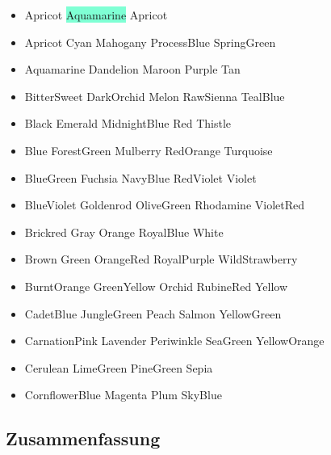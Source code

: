 \begin{itemize}
	\item[] \colorbox{Apricot}{Apricot} \colorbox{Aquamarine}{Aquamarine}
            \textcolor{Apricot}{Apricot}
	\item[] Apricot		Cyan		Mahogany		ProcessBlue		SpringGreen
	\item[] Aquamarine		Dandelion		Maroon		Purple		Tan
	\item[] BitterSweet		DarkOrchid		Melon		RawSienna		TealBlue
	\item[] Black		Emerald		MidnightBlue		Red		Thistle
	\item[] Blue		ForestGreen		Mulberry		RedOrange		Turquoise
	\item[] BlueGreen		Fuchsia		NavyBlue		RedViolet		Violet
	\item[] BlueViolet		Goldenrod		OliveGreen		Rhodamine		VioletRed
	\item[] Brickred		Gray		Orange		RoyalBlue		White
	\item[] Brown		Green		OrangeRed		RoyalPurple		WildStrawberry
	\item[] BurntOrange		GreenYellow		Orchid		RubineRed		Yellow
	\item[] CadetBlue		JungleGreen		Peach		Salmon		YellowGreen
	\item[] CarnationPink	Lavender	Periwinkle	SeaGreen YellowOrange
	\item[] Cerulean		LimeGreen		PineGreen		Sepia
	\item[] CornflowerBlue	Magenta	 Plum	SkyBlue
\end{itemize} 


\subsection{Zusammenfassung}
\label{zusammenfassung}

